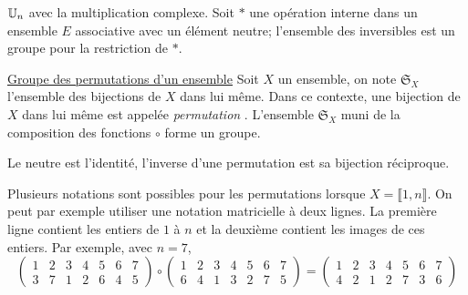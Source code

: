 \begin{exples}
  $\mathbb{U}_n$ avec la multiplication complexe. Soit $*$ une opération interne dans un ensemble $E$ associative avec un élément neutre; l'ensemble des inversibles est un groupe pour la restriction de $*$.
\end{exples}

  \begin{defi}\href{\baseurl C2260.pdf}{Groupe des permutations d'un ensemble}\newline
Soit $X$ un ensemble, on note $\mathfrak{S}_X$ l'ensemble des bijections de $X$ dans lui même. Dans ce contexte, une bijection de $X$ dans lui même est appelée \emph{permutation} . L'ensemble $\mathfrak{S}_X$ muni de la composition des fonctions $\circ$ forme un groupe.
  \end{defi}
\begin{rem}
  Le neutre est l'identité, l'inverse d'une permutation est sa bijection réciproque.
\end{rem}
Plusieurs notations sont possibles pour les permutations lorsque $X = \llbracket 1,n \rrbracket$. On peut par exemple utiliser une notation matricielle à deux lignes. La première ligne contient les entiers de $1$ à $n$ et la deuxième contient les images de ces entiers. Par exemple, avec $n=7$,
\begin{displaymath}
 \begin{pmatrix}
  1 & 2 & 3 & 4 & 5 & 6 & 7 \\
  3 & 7 & 1 & 2 & 6 & 4 & 5
 \end{pmatrix}
\circ
 \begin{pmatrix}
  1 & 2 & 3 & 4 & 5 & 6 & 7 \\
  6 & 4 & 1 & 3 & 2 & 7 & 5
 \end{pmatrix}
=
 \begin{pmatrix}
  1 & 2 & 3 & 4 & 5 & 6 & 7 \\
  4 & 2 & 1 & 2 & 7 & 3 & 6
 \end{pmatrix}
\end{displaymath}

